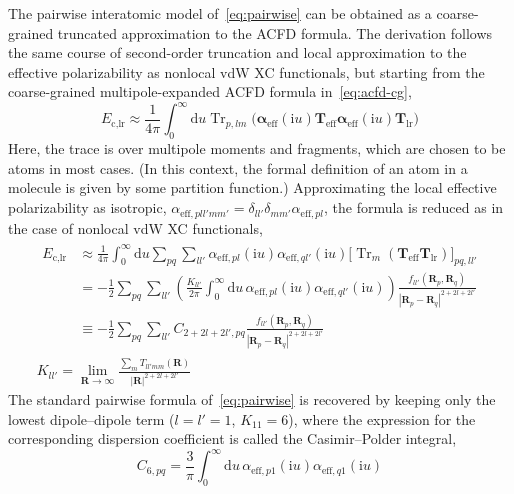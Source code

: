 The pairwise interatomic model of~\eqref{eq:pairwise} can be obtained as a coarse-grained truncated approximation to the ACFD formula.
The derivation follows the same course of second-order truncation and local approximation to the effective polarizability as nonlocal vdW XC functionals, but starting from the coarse-grained multipole-expanded ACFD formula in~\eqref{eq:acfd-cg},
\begin{equation}
  E_\text{c,lr}\approx
  \frac1{4\pi}\int_0^\infty\mathrm du\operatorname{Tr}_{p,lm}\big(\boldsymbol\alpha_\text{eff}(\mathrm iu)\mathbf T_\text{eff}\boldsymbol\alpha_\text{eff}(\mathrm iu)\mathbf T_\text{lr}\big)
\end{equation}
Here, the trace is over multipole moments and fragments, which are chosen to be atoms in most cases.
(In this context, the formal definition of an atom in a molecule is given by some partition function.)
Approximating the local effective polarizability as isotropic, $\alpha_{\text{eff},pll'mm'}=\delta_{ll'}\delta_{mm'}\alpha_{\text{eff},pl}$, the formula is reduced as in the case of nonlocal vdW XC functionals,
\begin{gather}
\begin{aligned}
  E_\text{c,lr}&\approx
  \frac1{4\pi}\int_0^\infty\mathrm du\sum_{pq}\sum_{ll'}\alpha_{\text{eff},pl}(\mathrm iu)\alpha_{\text{eff},ql'}(\mathrm iu)\big[\operatorname{Tr}_m(\mathbf T_\text{eff}\mathbf T_\text{lr})\big]_{pq,ll'} \\
  &=-\frac12\sum_{pq}\sum_{ll'}\left(\frac{K_{ll'}}{2\pi}\int_0^\infty\mathrm du\,\alpha_{\text{eff},pl}(\mathrm iu)\alpha_{\text{eff},ql'}(\mathrm iu)\right)\frac{f_{ll'}(\mathbf R_p,\mathbf R_q)}{|\mathbf R_p-\mathbf R_q|^{2+2l+2l'}} \\
  &\equiv-\frac12\sum_{pq}\sum_{ll'}C_{2+2l+2l',pq}\frac{f_{ll'}(\mathbf R_p,\mathbf R_q)}{|\mathbf R_p-\mathbf R_q|^{2+2l+2l'}}
\end{aligned}\label{eq:pairwise-mult} \\
K_{ll'}=\lim_{\mathbf R\rightarrow\infty}\frac{\sum_m T_{ll'mm}(\mathbf R)}{|\mathbf R|^{2+2l+2l'}}
\end{gather}
The standard pairwise formula of~\eqref{eq:pairwise} is recovered by keeping only the lowest dipole--dipole term ($l=l'=1$, $K_{11}=6$), where the expression for the corresponding dispersion coefficient is called the Casimir--Polder integral,
\begin{equation}
  C_{6,pq}=\frac3\pi\int_0^\infty\mathrm du\,\alpha_{\text{eff},p1}(\mathrm iu)\alpha_{\text{eff},q1}(\mathrm iu)
\end{equation}

